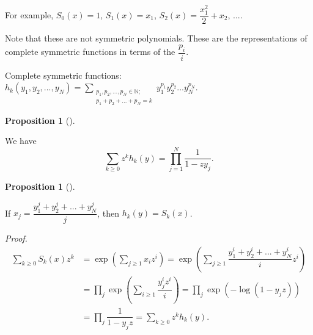 \documentclass
[numbers=enddot,12pt,final,onecolumn,german,notitlepage]{scrartcl}%
\theoremstyle{definition}
\newtheorem{prop}[theo]{Proposition}
\newenvironment{proposition}[1][]
{\begin{prop}[#1]\begin{leftbar}}
{\end{leftbar}\end{prop}}
\begin{document}
For example, $S_{0}\left(  x\right)  =1$, $S_{1}\left(  x\right)  =x_{1}$,
$S_{2}\left(  x\right)  =\dfrac{x_{1}^{2}}{2}+x_{2}$, $...$.

Note that these are not symmetric polynomials. These are the representations
of complete symmetric functions in terms of the $\dfrac{p_{i}}{i}$.

Complete symmetric functions: $h_{k}\left(  y_{1},y_{2},...,y_{N}\right)
=\sum\limits_{\substack{p_{1},p_{2},...,p_{N}\in\mathbb{N};\\p_{1}%
+p_{2}+...+p_{N}=k}}y_{1}^{p_{1}}y_{2}^{p_{2}}...y_{N}^{p_{N}}$.

\begin{proposition}
We have%
\[
\sum\limits_{k\geq0}z^{k}h_{k}\left(  y\right)  =\prod\limits_{j=1}^{N}%
\dfrac{1}{1-zy_{j}}.
\]

\end{proposition}

\begin{proposition}
\label{prop.h_k.as.schur}If $x_{j}=\dfrac{y_{1}^{j}+y_{2}^{j}+...+y_{N}^{j}%
}{j}$, then $h_{k}\left(  y\right)  =S_{k}\left(  x\right)  $.
\end{proposition}

\textit{Proof.}
\begin{align*}
\sum\limits_{k\geq0}S_{k}\left(  x\right)  z^{k}  &  =\exp\left(
\sum\limits_{j\geq1}x_{i}z^{i}\right)  =\exp\left(  \sum\limits_{j\geq1}%
\dfrac{y_{1}^{i}+y_{2}^{i}+...+y_{N}^{i}}{i}z^{i}\right) \\
&  =\prod\limits_{j}\exp\left(  \sum\limits_{i\geq1}\dfrac{y_{j}^{i}z^{i}}%
{i}\right)  =\prod\limits_{j}\exp\left(  -\log\left(  1-y_{j}z\right)  \right)
\\
&  =\prod\limits_{j}\dfrac{1}{1-y_{j}z}=\sum\limits_{k\geq0}z^{k}h_{k}\left(
y\right)  .
\end{align*}
\end{document}
